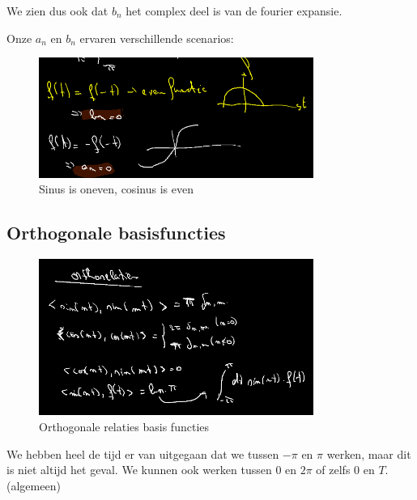 \documentclass[a4paper]{report}
\begin{document}
We zien dus ook dat $b_n$ het complex deel is van de fourier expansie.

Onze $a_n$ en $b_n$ ervaren verschillende scenarios:



\begin{figure}[H]
	\centering
	\includegraphics[width=0.8\textwidth]{assets/a_n_b_n_even_oneven.png}
	\caption{Sinus is oneven, cosinus is even}
	\label{fig:a_n_b_n_even_oneven}
\end{figure}

\subsection{Orthogonale basisfuncties}

\begin{figure}[H]
	\centering
	\includegraphics[width=0.8\textwidth]{assets/ortho_relaties_basis_functies.png}
	\caption{Orthogonale relaties basis functies}
	\label{fig:ortho_relaties_basis_functies}
\end{figure}

We hebben heel de tijd er van uitgegaan dat we tussen $-\pi$ en $\pi$ werken, maar dit is niet altijd het geval. We kunnen ook werken tussen $0$ en $2\pi$ of zelfs $0$ en $T$. (algemeen)
\end{document}
